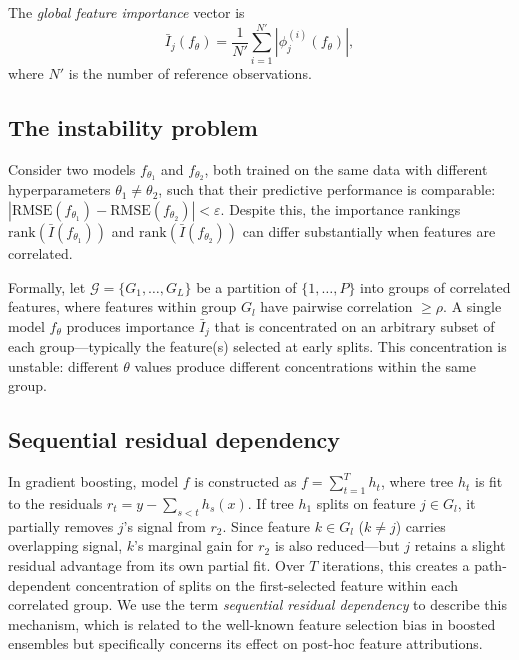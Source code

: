 \documentclass[10pt]{article}
\newcommand{\rhovar}{\rho}
\begin{document}
The \emph{global feature importance} vector is
\begin{equation}
  \bar{I}_j(f_\theta) = \frac{1}{N'} \sum_{i=1}^{N'} |\phi_j^{(i)}(f_\theta)|,
  \label{eq:global_importance}
\end{equation}
where $N'$ is the number of reference observations.

\subsection{The instability problem}

Consider two models $f_{\theta_1}$ and $f_{\theta_2}$, both trained on the
same data with different hyperparameters $\theta_1 \neq \theta_2$, such
that their predictive performance is comparable:
$|\text{RMSE}(f_{\theta_1}) - \text{RMSE}(f_{\theta_2})| < \varepsilon$.
Despite this, the importance rankings
$\text{rank}(\bar{I}(f_{\theta_1}))$ and
$\text{rank}(\bar{I}(f_{\theta_2}))$ can differ substantially when
features are correlated.

Formally, let $\mathcal{G} = \{G_1, \ldots, G_L\}$ be a partition of
$\{1, \ldots, P\}$ into groups of correlated features, where features
within group $G_l$ have pairwise correlation $\geq \rhovar$. A single
model $f_\theta$ produces importance $\bar{I}_j$ that is concentrated on
an arbitrary subset of each group---typically the feature(s) selected at
early splits. This concentration is unstable: different $\theta$ values
produce different concentrations within the same group.

\subsection{Sequential residual dependency}

In gradient boosting, model $f$ is constructed as $f =
\sum_{t=1}^{T} h_t$, where tree $h_t$ is fit to the residuals
$r_t = y - \sum_{s<t} h_s(x)$. If tree $h_1$ splits on feature $j \in
G_l$, it partially removes $j$'s signal from $r_2$. Since feature $k
\in G_l$ ($k \neq j$) carries overlapping signal, $k$'s marginal gain
for $r_2$ is also reduced---but $j$ retains a slight residual advantage
from its own partial fit. Over $T$ iterations, this creates a
path-dependent concentration of splits on the first-selected feature
within each correlated group. We use the term \emph{sequential residual
dependency} to describe this mechanism, which is related to the
well-known feature selection bias in boosted ensembles but specifically
concerns its effect on post-hoc feature attributions.
\end{document}
